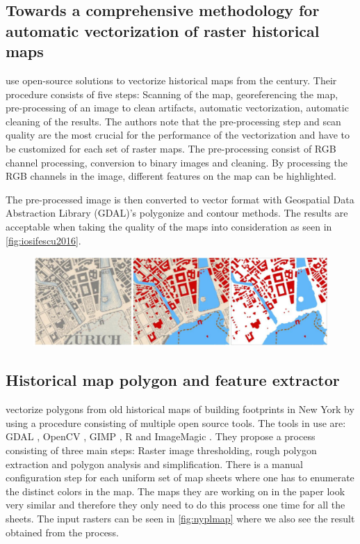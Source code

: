\subsection{Towards a comprehensive methodology for automatic vectorization of raster historical maps}
\citet{Iosifescu2016} use open-source solutions to vectorize historical maps from the  century. Their procedure consists of five steps: Scanning of the map, georeferencing the map, pre-processing of an image to clean artifacts, automatic vectorization, automatic cleaning of the results. The authors note that the pre-processing step and scan quality are the most crucial for the performance of the vectorization and have to be customized for each set of raster maps. The pre-processing consist of RGB channel processing, conversion to binary images and cleaning. By processing the RGB channels in the image, different features on the map can be highlighted.

The pre-processed image is then converted to vector format with Geospatial Data Abstraction Library \cite{OSGeoa} (GDAL)'s polygonize and contour methods. The results are acceptable when taking the quality of the maps into consideration as seen in \autoref{fig:iosifescu2016}. 

\begin{figure}[H]
	\centering
	\includegraphics[width=0.9\linewidth]{fig/iosifescu2016.png}
	\label{fig:iosifescu2016}
\end{figure}

\subsection{Historical map polygon and feature extractor}

\citet{GiraldoArteaga2013} vectorize polygons from old historical maps of building footprints in New York by using a procedure consisting of multiple open source tools. The tools in use are: GDAL \cite{OSGeoa}, OpenCV \cite{OpenVCTeam2017}, GIMP \cite{GIMP2017}, R \cite{TheRFoundation2017} and ImageMagic \cite{ImageMagickStudioLLC2017}. They propose a process consisting of three main steps: Raster image thresholding, rough polygon extraction and polygon analysis and simplification. There is a manual configuration step for each uniform set of map sheets where one has to enumerate the distinct colors in the map. The maps they are working on in the paper look very similar and therefore they only need to do this process one time for all the sheets. The input rasters can be seen in \autoref{fig:nyplmap} where we also see the result obtained from the process.


